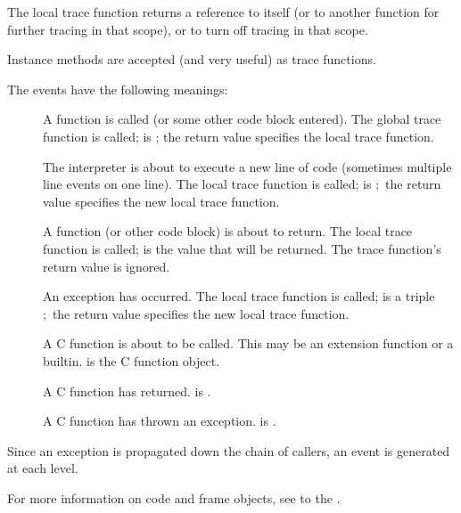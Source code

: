 The local trace function  returns a reference to itself (or to
another function for further tracing in that scope), or  to
turn off tracing in that scope.

Instance methods are accepted (and very useful) as trace functions.

The events have the following meanings:

\begin{description}

\item[]
A function is called (or some other code block entered).  The global
trace function is called;  is ;
the return value specifies the local trace function.

\item[]
The interpreter is about to execute a new line of code (sometimes
multiple line events on one line).  The local trace function is
called;  is ;\ the return value specifies the new
local trace function.

\item[]
A function (or other code block) is about to return.  The local trace
function is called;  is the value that will be returned.  The
trace function's return value is ignored.

\item[]
An exception has occurred.  The local trace function is called;
 is a triple ;\ the return value specifies the new local trace
function.

\item[]
A C function is about to be called.  This may be an extension function
or a builtin.   is the C function object.

\item[]
A C function has returned.  is .

\item[]
A C function has thrown an exception.   is .

\end{description}

Since an exception is propagated down the chain of callers, an
 event is generated at each level.

For more information on code and frame objects, see to the
.

